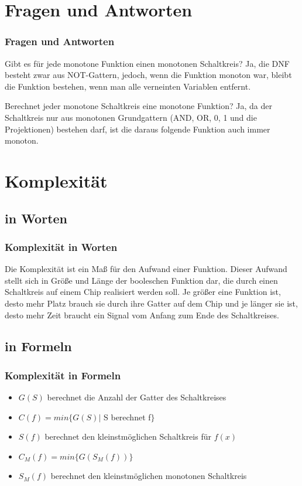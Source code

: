 \documentclass[hyperref={pdfpagelabels=false}]{beamer} %
\begin{document}
  \section{Fragen und Antworten}
  \begin{frame}%
    \frametitle{Fragen und Antworten}
    \begin{block}{Gibt es für jede monotone Funktion einen monotonen Schaltkreis?}
      Ja, die DNF besteht zwar aus NOT-Gattern, jedoch, wenn die Funktion monoton war, bleibt die Funktion bestehen, wenn man alle verneinten Variablen entfernt.
    \end{block}
    \begin{block}{Berechnet jeder monotone Schaltkreis eine monotone Funktion?}
      Ja, da der Schaltkreis nur aus monotonen Grundgattern (AND, OR, 0, 1 und die Projektionen) bestehen darf, ist die daraus folgende Funktion auch immer monoton.
    \end{block}
  \end{frame}

  \section{Komplexität}
  \subsection*{in Worten}
    \begin{frame}%
    \frametitle{Komplexität in Worten}
    Die Komplexität ist ein Maß für den Aufwand einer Funktion.
    Dieser Aufwand stellt sich in Grö\ss{}e und Länge der booleschen Funktion dar, die durch einen Schaltkreis auf einem Chip realisiert werden soll.
    Je grö\ss{}er eine Funktion ist, desto mehr Platz brauch sie durch ihre Gatter auf dem Chip und je länger sie ist, desto mehr Zeit braucht ein Signal vom Anfang zum Ende des Schaltkreises.
  \end{frame}

  \subsection*{in Formeln}
  \begin{frame}
    \frametitle{Komplexität in Formeln}
    \begin{itemize}
      \item $G(S)$ berechnet die Anzahl der Gatter des Schaltkreises
      \item $C(f) = min \{G(S) |$ S berechnet f$\}$
      \item $S(f)$ berechnet den kleinstmöglichen Schaltkreis für $f(x)$
      \item $C_M(f) = min \{G(S_M(f))\}$
      \item $S_M(f)$ berechnet den kleinstmöglichen monotonen Schaltkreis
    \end{itemize}
  \end{frame}
\end{document}

